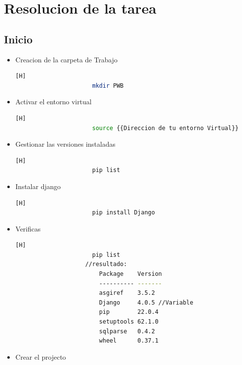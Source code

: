 \documentclass{article}
\begin{document}
	\section{Resolucion de la tarea}
    \subsection{Inicio}
    \begin{itemize}
        \item Creacion de la carpeta de Trabajo
        \begin{lstlisting}[language=bash,caption={Entorno de Linux-Ejecute el script de activación para activar el entorno virtual:}][H]
    		          mkdir PWB
    	\end{lstlisting}
        \item Activar el entorno virtual
        \begin{lstlisting}[language=bash,caption={Entorno de Linux-Ejecute el script de activación para activar el entorno virtual:}][H]
    		          source {{Direccion de tu entorno Virtual}}
    	\end{lstlisting}
         \item Gestionar las versiones instaladas
        \begin{lstlisting}[language=bash,caption={Entorno de Linux-Ejecute el script de activación para activar el entorno virtual:}][H]
    		          pip list
    	\end{lstlisting}
        \item Instalar django
        \begin{lstlisting}[language=bash,caption={Entorno de Linux-Ejecute el script de activación para activar el entorno virtual:}][H]
    		          pip install Django
    	\end{lstlisting}
        \item Verificas
        \begin{lstlisting}[language=bash,caption={Entorno de Linux-Ejecute el script de activación para activar el entorno virtual:}][H]
    		          pip list
                    //resultado:
                        Package    Version
                        ---------- -------
                        asgiref    3.5.2
                        Django     4.0.5 //Variable
                        pip        22.0.4
                        setuptools 62.1.0
                        sqlparse   0.4.2
                        wheel      0.37.1
    	\end{lstlisting}
        \item Crear el projecto

\end{itemize}
\end{document}
